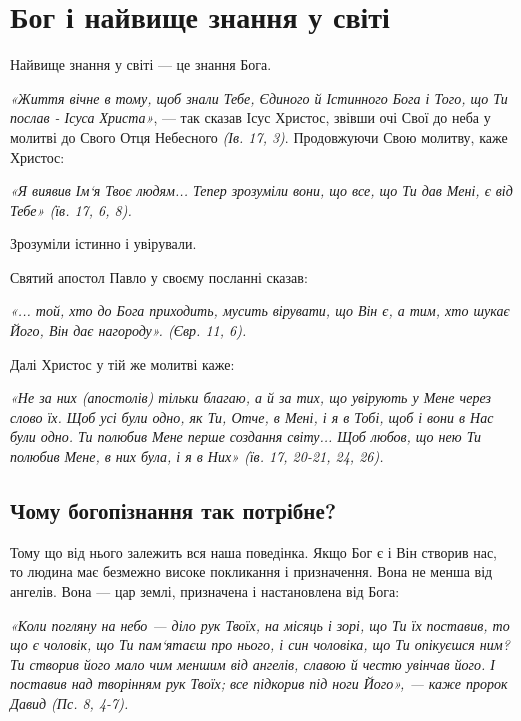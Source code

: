 \documentclass[main.tex]{subfiles}
\begin{document}
\chapter{Бог і найвище знання у світі}

Найвище знання у світі — це знання Бога.

\emph{{\color{red}«Життя вічне в тому, щоб знали Тебе, Єдиного й Істинного Бога і Того, що Ти послав - Ісуса Христа»}}, — так сказав Ісус Христос, звівши очі Свої до неба у молитві до Свого Отця Небесного \emph{(Ів. 17, 3)}. Продовжуючи Свою молитву, каже Христос:

\begin{FlushRight}
    \emph{{\color{red}«Я виявив Ім`я Твоє людям... Тепер зрозуміли вони, що все, що Ти дав Мені, є від Тебе»} (їв. 17, 6, 8). }
\end{FlushRight}

Зрозуміли істинно і увірували.

Святий апостол Павло у своєму посланні сказав:

\begin{FlushRight}
    \emph{«... той, хто до Бога приходить, мусить вірувати, що Він є, а тим, хто шукає Його, Він дає нагороду». (Євр. 11, 6).}
\end{FlushRight}

Далі Христос у тій же молитві каже:

\begin{FlushRight}
    \emph{{\color{red}«Не за них (апостолів) тільки благаю, а й за тих, що увірують у Мене через слово їх. Щоб усі були одно, як Ти, Отче, в Мені, і я в Тобі, щоб і вони в Нас були одно. Ти полюбив Мене перше создання світу... Щоб любов, що нею Ти полюбив Мене, в них була, і я в Них» } (їв. 17, 20-21, 24, 26).}
\end{FlushRight}

\section{Чому богопізнання так потрібне?}

Тому що від нього залежить вся наша поведінка. Якщо Бог є і Він створив нас, то людина має безмежно високе покликання і призначення. Вона не менша від ангелів. Вона — цар землі, призначена і настановлена від Бога:

\begin{FlushRight}
    \emph{«Коли погляну на небо — діло рук Твоїх, на місяць і зорі, що Ти їх поставив, то що є чоловік, що Ти пам`ятаєш про нього, і син чоловіка, що Ти опікуєшся ним? Ти створив його мало чим меншим від ангелів, славою й честю увінчав його. І поставив над творінням рук Твоїх; все підкорив під ноги Його», — каже пророк Давид (Пс. 8, 4-7).}
\end{FlushRight}
\end{document}
